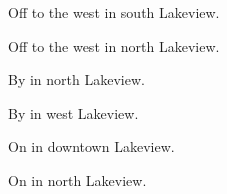 

\begin{LocationList}

Off  to the west in south Lakeview.

Off   to the west in north Lakeview.

By   in north Lakeview.

By  in west Lakeview.

On  in downtown Lakeview.

\Location{\TruckStop \Gas \Rest \Service}
On   in north Lakeview.

\end{LocationList}
